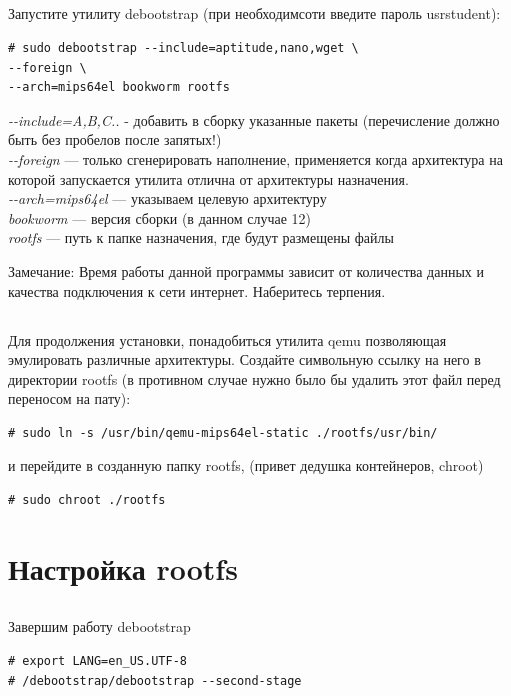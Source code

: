 \subsection{} Запустите утилиту debootstrap (при необходимсоти введите пароль usrstudent):
\begin{lstlisting}[style=bash]
# sudo debootstrap --include=aptitude,nano,wget \
--foreign \
--arch=mips64el bookworm rootfs
\end{lstlisting}
\textit{-{}-include=A,B,C..} - добавить в сборку указанные пакеты (перечисление должно быть без пробелов после запятых!)\\
\textit{-{}-foreign} — только сгенерировать наполнение, применяется когда архитектура на которой запускается утилита отлична от архитектуры назначения. \\
\textit{-{}-arch=mips64el} — указываем целевую архитектуру \\
\textit{bookworm} — версия сборки (в данном случае 12) \\
\textit{rootfs} — путь к папке назначения, где будут размещены файлы \\

\begin{Notes}{Замечание:}
	Время работы данной программы зависит от количества данных и качества подключения к сети интернет. Наберитесь терпения.
\end{Notes}

\subsection{} Для продолжения установки, понадобиться утилита qemu позволяющая эмулировать различные архитектуры. Создайте символьную ссылку на него в директории rootfs (в противном случае нужно было бы удалить этот файл перед переносом на пату):
\begin{lstlisting}[style=bash]
# sudo ln -s /usr/bin/qemu-mips64el-static ./rootfs/usr/bin/
\end{lstlisting}
и перейдите в созданную папку rootfs, (привет дедушка контейнеров, chroot)
\begin{lstlisting}[style=bash]
# sudo chroot ./rootfs
\end{lstlisting}


\section{Настройка rootfs}

\subsection{} Завершим работу debootstrap
\begin{lstlisting}[style=bash]
# export LANG=en_US.UTF-8
# /debootstrap/debootstrap --second-stage
\end{lstlisting}


